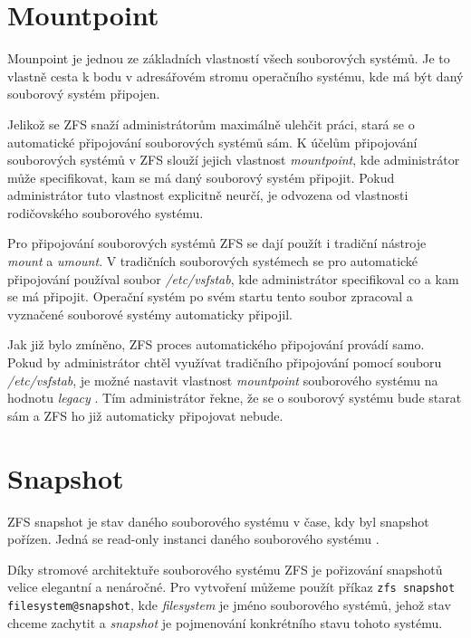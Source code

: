 \section{Mountpoint}
\label{mountpoint}
Mounpoint je jednou ze základních vlastností všech souborových systémů. Je to vlastně cesta k bodu v adresářovém stromu operačního systému, kde má být daný souborový systém připojen.

Jelikož se ZFS snaží administrátorům maximálně ulehčit práci, stará se o automatické připojování souborových systémů sám. K účelům připojování souborových systémů v ZFS slouží jejich vlastnost \emph{mountpoint}, kde administrátor může specifikovat, kam se má daný souborový systém připojit. Pokud administrátor tuto vlastnost explicitně neurčí, je odvozena od vlastnosti rodičovského souborového systému.

Pro připojování souborových systémů ZFS se dají použít i tradiční nástroje \emph{mount} a \emph{umount}. V tradičních souborových systémech se pro automatické připojování používal soubor \emph{/etc/vsfstab}, kde administrátor specifikoval co a kam se má připojit. Operační systém po svém startu tento soubor zpracoval a vyznačené souborové systémy automaticky připojil.

Jak již bylo zmíněno, ZFS proces automatického připojování provádí samo. Pokud by administrátor chtěl využívat tradičního připojování pomocí souboru \emph{/etc/vsfstab}, je možné nastavit vlastnost \emph{mountpoint} souborového systému na hodnotu \emph{legacy} \cite{mountpoint}. Tím administrátor řekne, že se o souborový systému bude starat sám a ZFS ho již automaticky připojovat nebude.
\section{Snapshot}
\label{snapshot}
ZFS snapshot je stav daného souborového systému v čase, kdy byl snapshot pořízen. Jedná se read-only instanci daného souborového systému \cite{snapshot}.

Díky stromové architektuře souborového systému ZFS je pořizování snapshotů velice elegantní a nenáročné. Pro vytvoření můžeme použít příkaz \verb|zfs snapshot filesystem@snapshot|, kde \emph{filesystem} je jméno souborového systémů, jehož stav chceme zachytit a \emph{snapshot} je pojmenování konkrétního stavu tohoto systému.

